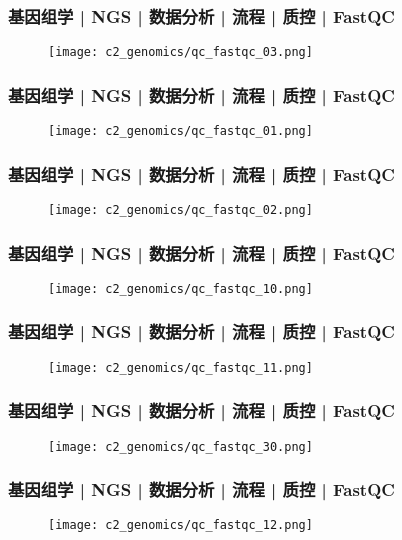 \begin{frame}
  \frametitle{基因组学 | NGS | 数据分析 | 流程 | 质控 | FastQC}
  \begin{figure}
    \centering
    \texttt{[image: c2\_genomics/qc\_fastqc\_03.png]}
  \end{figure}
\end{frame}

\begin{frame}
  \frametitle{基因组学 | NGS | 数据分析 | 流程 | 质控 | FastQC}
  \begin{figure}
    \centering
    \texttt{[image: c2\_genomics/qc\_fastqc\_01.png]}
  \end{figure}
\end{frame}

\begin{frame}
  \frametitle{基因组学 | NGS | 数据分析 | 流程 | 质控 | FastQC}
  \begin{figure}
    \centering
    \texttt{[image: c2\_genomics/qc\_fastqc\_02.png]}
  \end{figure}
\end{frame}

\begin{frame}
  \frametitle{基因组学 | NGS | 数据分析 | 流程 | 质控 | FastQC}
  \begin{figure}
    \centering
    \texttt{[image: c2\_genomics/qc\_fastqc\_10.png]}
  \end{figure}
\end{frame}

\begin{frame}
  \frametitle{基因组学 | NGS | 数据分析 | 流程 | 质控 | FastQC}
  \begin{figure}
    \centering
    \texttt{[image: c2\_genomics/qc\_fastqc\_11.png]}
  \end{figure}
\end{frame}

\begin{frame}
  \frametitle{基因组学 | NGS | 数据分析 | 流程 | 质控 | FastQC}
  \begin{figure}
    \centering
    \texttt{[image: c2\_genomics/qc\_fastqc\_30.png]}
  \end{figure}
\end{frame}

\begin{frame}
  \frametitle{基因组学 | NGS | 数据分析 | 流程 | 质控 | FastQC}
  \begin{figure}
    \centering
    \texttt{[image: c2\_genomics/qc\_fastqc\_12.png]}
  \end{figure}
\end{frame}

